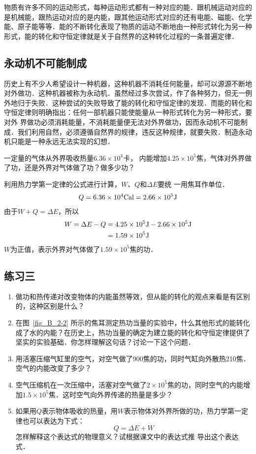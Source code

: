 物质有许多不同的运动形式，每种运动形式都有一种对应的能．跟机械运动对应的是机械能，跟热运动对应的是内能，跟其他运动形式对应的还有电能、磁能、化学能、原子能等等．能的不断转化表现了物质的运动不断地由一种形式转化为另一种形式，能的转化和守恒定律就是关于自然界的这种转化过程的一条普遍定律．

\subsection{永动机不可能制成} 
历史上有不少人希望设计一种机器，这种机器不消耗任何能量，却可以源源不断地对外做功．这种机器被称为永动机．虽然经过多次尝试，作了各种努力，但无一例外地归于失败．这种尝试的失败导致了能的转化和守恒定律的发现．而能的转化和守恒定律则明确指出：任何一部机器只能使能量从一种形式转化为另一种形式，要对外
界做功必须消耗能量，不消耗能量便无法对外界做功，因而永动机不可能制成．我们利用自然，必须遵循自然界的规律，违反这种规律，就要失败．制造永动机只能是一种永远无法实现的幻想．

\begin{example}
    一定量的气体从外界吸收热量$6.36\times 10^4$卡，
内能增加$4.25\times 10^5$焦，气体对外界做了功，还是外界对气体做了功？做多少功？    
\end{example}

\begin{solution}
利用热力学第一定律的公式进行计算，$W$、$Q$和$\Delta E$要统
一用焦耳作单位．
\[Q=6.36\times 10^{4}{\rm Cal}=2.66\times 10^5{\rm J}\]
由于$W+Q=\Delta E$，所以
\[\begin{split}
W=\Delta E-Q&=4.25 \times 10^5{\rm J}-2.66\times 10^5{\rm J}\\
&=1.59\times 10^5{\rm J}
\end{split} \]
$W$为正值，表示外界对气体做了$1.59\times 10^5$焦的功．
\end{solution}

\subsection*{练习三}
\begin{enumerate}
\item 做功和热传递对改变物体的内能虽然等效，但从能的转化的观点来看是有区别的，这种区别是什么？
\item 在图~\ref{fig_B_2-2} 所示的焦耳测定热功当量的实验中，什么其他形式的能转化成了水的内能？在历史上，热功当量的确定为建立能的转化和守恒定律提供了坚实的实验基础．你怎样理解这句话？讨论一下这个问题．
\item 用活塞压缩气缸里的空气，对空气做了900焦的功，同时气缸向外散热210焦．空气的内能改变了多少？
\item 空气压缩机在一次压缩中，活塞对空气做了$2\times 10^5$焦的功，同时空气的内能增加$1.5\times 10^5$焦．这时空气向外界传递的热量是多少？
\item 如果用$Q$表示物体吸收的热量，用$W$表示物体对外界所做的功，热力学第一定律也可以表达为下式：
\[Q=\Delta E+W\]
怎样解释这个表达式的物理意义？试根据课文中的表达式推
导出这个表达式．
\end{enumerate}


